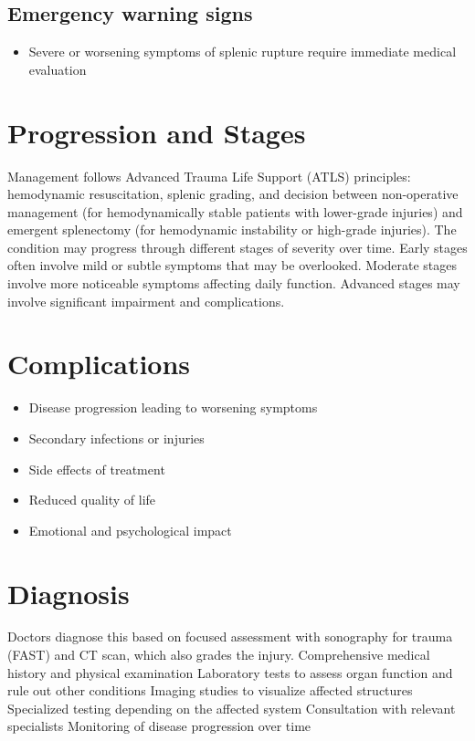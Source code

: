 \subsection{Emergency warning signs}
\begin{itemize}[noitemsep]
  \item Severe or worsening symptoms of splenic rupture require immediate medical evaluation
\end{itemize}
\section{Progression and Stages}
Management follows Advanced Trauma Life Support (ATLS) principles: hemodynamic resuscitation, splenic grading, and decision between non-operative management (for hemodynamically stable patients with lower-grade injuries) and emergent splenectomy (for hemodynamic instability or high-grade injuries). The condition may progress through different stages of severity over time. Early stages often involve mild or subtle symptoms that may be overlooked. Moderate stages involve more noticeable symptoms affecting daily function. Advanced stages may involve significant impairment and complications.
\section{Complications}
\begin{itemize}[noitemsep]
  \item Disease progression leading to worsening symptoms
  \item Secondary infections or injuries
  \item Side effects of treatment
  \item Reduced quality of life
  \item Emotional and psychological impact
\end{itemize}
\section{Diagnosis}
Doctors diagnose this based on focused assessment with sonography for trauma (FAST) and CT scan, which also grades the injury. Comprehensive medical history and physical examination Laboratory tests to assess organ function and rule out other conditions Imaging studies to visualize affected structures Specialized testing depending on the affected system Consultation with relevant specialists Monitoring of disease progression over time

